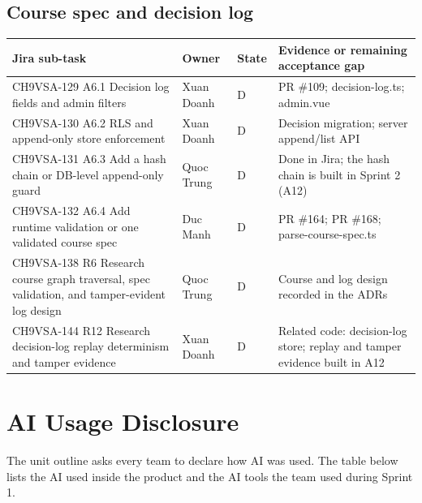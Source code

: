 \documentclass[11pt,a4paper]{article}
\begin{document}
\subsection{Course spec and decision log}
{\small
\begin{longtable}{>{\raggedright\arraybackslash}p{}>{\raggedright\arraybackslash}p{}>{\raggedright\arraybackslash}p{}>{\raggedright\arraybackslash}p{}}
\toprule
\textbf{Jira sub-task} & \textbf{Owner} & \textbf{State} & \textbf{Evidence or remaining acceptance gap} \\
\midrule
\endhead
CH9VSA-129 \newline A6.1 Decision log fields and admin filters & Xuan Doanh & D & PR \#109; decision-log.ts; admin.vue \\
CH9VSA-130 \newline A6.2 RLS and append-only store enforcement & Xuan Doanh & D & Decision migration; server append/list API \\
CH9VSA-131 \newline A6.3 Add a hash chain or DB-level append-only guard & Quoc Trung & D & Done in Jira; the hash chain is built in Sprint 2 (A12) \\
CH9VSA-132 \newline A6.4 Add runtime validation or one validated course spec & Duc Manh & D & PR \#164; PR \#168; parse-course-spec.ts \\
CH9VSA-138 \newline R6 Research course graph traversal, spec validation, and tamper-evident log design & Quoc Trung & D & Course and log design recorded in the ADRs \\
CH9VSA-144 \newline R12 Research decision-log replay determinism and tamper evidence & Xuan Doanh & D & Related code: decision-log store; replay and tamper evidence built in A12 \\
\bottomrule
\end{longtable}}
\section{AI Usage Disclosure}
The unit outline asks every team to declare how AI was used. The table below lists the AI used inside the product and the AI tools the team used during Sprint 1.
\end{document}

